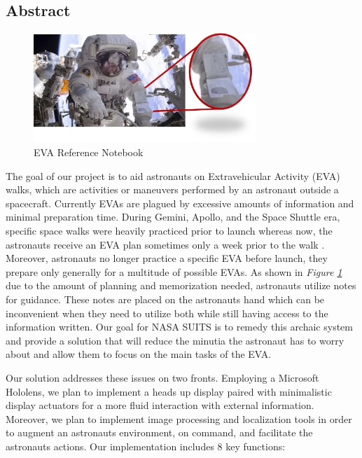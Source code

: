 \documentclass{article}
\let\Oldsubsection\subsection
\renewcommand{\subsection}{\FloatBarrier\Oldsubsection}
\begin{document}
\subsection{Abstract}

\begin{figure}[!htb]
  \centering
  \includegraphics[width=0.75\textwidth]{assets/spacesuitdisplay.png}
  \caption{EVA Reference Notebook}
  \label{fig:spacesuitdisplay}
\end{figure}

The goal of our project is to aid astronauts on Extravehicular Activity (EVA) walks, which are activities or maneuvers performed by an astronaut outside a spacecraft. Currently EVAs are plagued by excessive amounts of information and minimal preparation time. During Gemini, Apollo, and the Space Shuttle era, specific space walks were heavily practiced prior to launch whereas now, the astronauts receive an EVA plan sometimes only a week prior to the walk \autocite{mannedspaceflight}. Moreover, astronauts no longer practice a specific EVA before launch, they prepare only generally for a multitude of possible EVAs. As shown in \textit{Figure \ref{fig:spacesuitdisplay}} due to the amount of planning and memorization needed, astronauts utilize notes for guidance. These notes are placed on the astronauts hand which can be inconvenient when they need to utilize both while still having access to the information written. Our goal for NASA SUITS is to remedy this archaic system and provide a solution that will reduce the minutia the astronaut has to worry about and allow them to focus on the main tasks of the EVA.

Our solution addresses these issues on two fronts. Employing a Microsoft Hololens, we plan to implement a heads up display paired with minimalistic display actuators for a more fluid interaction with external information. Moreover, we plan to implement image processing and localization tools in order to augment an astronauts environment, on command, and facilitate the astronauts actions. Our implementation includes 8 key functions:
\end{document}
